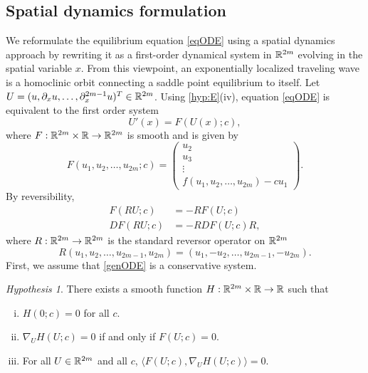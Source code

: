 \documentclass[10pt,reqno]{amsart}
\theoremstyle{plain}
\theoremstyle{definition}
\theoremstyle{remark}
\newtheorem{hypothesis}[theorem]{Hypothesis}
\numberwithin{theorem}{section}
\numberwithin{equation}{section}
\begin{document}
\subsection{Spatial dynamics formulation}\label{sec:spatdym}

We reformulate the equilibrium equation \cref{eqODE} using a spatial dynamics approach by rewriting it as a first-order dynamical system in $\mathbb{R}^{2m}$ evolving in the spatial variable $x$. From this viewpoint, an exponentially localized traveling wave is a homoclinic orbit connecting a saddle point equilibrium to itself. Let $U = (u, \partial_x u, \dots, \partial_x^{2m-1} u)^T \in \mathbb{R}^{2m}$. Using \cref{hyp:E}(iv), equation \cref{eqODE} is equivalent to the first order system
\begin{equation}\label{genODE}
U'(x) = F(U(x); c),
\end{equation}
where $F: \mathbb{R}^{2m} \times \mathbb{R} \rightarrow \mathbb{R}^{2m}$ is smooth and is given by
\begin{equation}\label{defF}
F(u_1, u_2, \dots, u_{2m}; c) = 
\begin{pmatrix}
u_2 \\ u_3 \\ \vdots \\ f(u_1, u_2, \dots, u_{2m}) - c u_1
\end{pmatrix}.
\end{equation}
By reversibility,
\begin{equation}\label{genODErev}
\begin{aligned}
F(RU; c) &= -RF(U; c) \\
DF(RU; c) &= -RDF(U; c)R,
\end{aligned}
\end{equation}
where $R:\mathbb{R}^{2m} \rightarrow \mathbb{R}^{2m}$ is the standard reversor operator on $\mathbb{R}^{2m}$
\begin{equation}\label{reverserR2m}
R(u_1, u_2, \dots, u_{2m-1}, u_{2m}) = (u_1, -u_2, \dots, u_{2m-1}, -u_{2m}).
\end{equation}
First, we assume that \cref{genODE} is a conservative system.
\begin{hypothesis}\label{hyp:H}
There exists a smooth function $H: \mathbb{R}^{2m} \times \mathbb{R} \rightarrow \mathbb{R}$ such that 
\begin{enumerate}[(i)]
\item $H(0; c) = 0$ for all $c$.
\item $\nabla_U H(U; c) = 0$ if and only if $F(U; c) = 0$.
\item For all $U \in \mathbb{R}^{2m}$ and all $c$, $\langle F(U; c), \nabla_U H(U; c) \rangle = 0$.
\end{enumerate}
\end{hypothesis}
\end{document}
